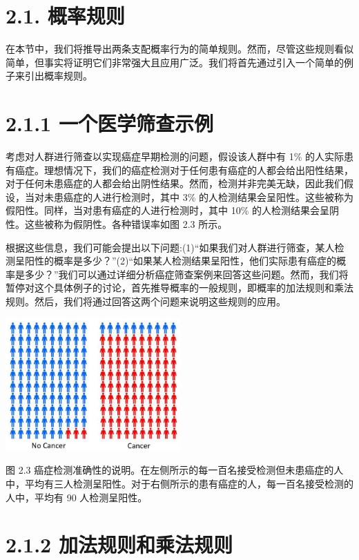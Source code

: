 \documentclass[10pt]{article}
\begin{document}
\section*{2.1. 概率规则}

在本节中，我们将推导出两条支配概率行为的简单规则。然而，尽管这些规则看似简单，但事实将证明它们非常强大且应用广泛。我们将首先通过引入一个简单的例子来引出概率规则。

\section*{2.1.1 一个医学筛查示例}

考虑对人群进行筛查以实现癌症早期检测的问题，假设该人群中有 1\% 的人实际患有癌症。理想情况下，我们的癌症检测对于任何患有癌症的人都会给出阳性结果，对于任何未患癌症的人都会给出阴性结果。然而，检测并非完美无缺，因此我们假设，当对未患癌症的人进行检测时，其中 3\% 的人检测结果会呈阳性。这些被称为假阳性。同样，当对患有癌症的人进行检测时，其中 10\% 的人检测结果会呈阴性。这些被称为假阴性。各种错误率如图 2.3 所示。

根据这些信息，我们可能会提出以下问题:(1)“如果我们对人群进行筛查，某人检测呈阳性的概率是多少？”(2)“如果某人检测结果呈阳性，他们实际患有癌症的概率是多少？”我们可以通过详细分析癌症筛查案例来回答这些问题。然而，我们将暂停对这个具体例子的讨论，首先推导概率的一般规则，即概率的加法规则和乘法规则。然后，我们将通过回答这两个问题来说明这些规则的应用。

\begin{center}
\includegraphics[max width=0.5\textwidth]{images/0194e279-9b28-703a-88f4-c3ac21e2010d_45_904_342_649_495_0.jpg}
\end{center}
\hspace*{3em} 

图 2.3 癌症检测准确性的说明。在左侧所示的每一百名接受检测但未患癌症的人中，平均有三人检测呈阳性。对于右侧所示的患有癌症的人，每一百名接受检测的人中，平均有 90 人检测呈阳性。

\section*{2.1.2 加法规则和乘法规则}
\end{document}
